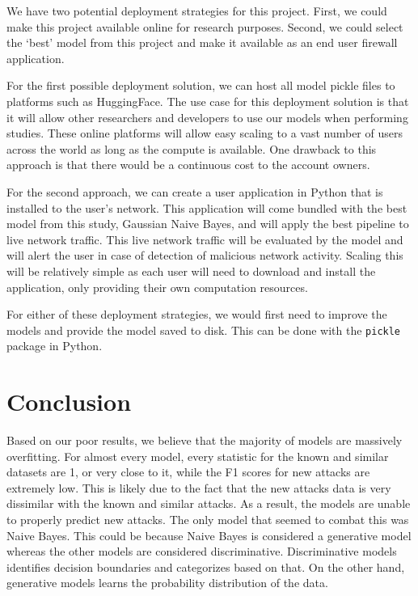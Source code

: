 We have two potential deployment strategies for this project. First, we could make this project available online for research purposes. Second, we could select the `best' model from this project and make it available as an end user firewall application.

For the first possible deployment solution, we can host all model pickle files to platforms such as HuggingFace. The use case for this deployment solution is that it will allow other researchers and developers to use our models when performing studies. These online platforms will allow easy scaling to a vast number of users across the world as long as the compute is available. One drawback to this approach is that there would be a continuous cost to the account owners.

For the second approach, we can create a user application in Python that is installed to the user's network. This application will come bundled with the best model from this study, Gaussian Naive Bayes, and will apply the best pipeline to live network traffic. This live network traffic will be evaluated by the model and will alert the user in case of detection of malicious network activity. Scaling this will be relatively simple as each user will need to download and install the application, only providing their own computation resources.

For either of these deployment strategies, we would first need to improve the models and provide the model saved to disk. This can be done with the \lstinline{pickle} package in Python.



\section{Conclusion}

Based on our poor results, we believe that the majority of models are massively overfitting. For almost every model, every statistic for the known and similar datasets are 1, or very close to it, while the F1 scores for new attacks are extremely low. This is likely due to the fact that the new attacks data is very dissimilar with the known and similar attacks. As a result, the models are unable to properly predict new attacks. The only model that seemed to combat this was Naive Bayes. This could be because Naive Bayes is considered a generative model whereas the other models are considered discriminative. Discriminative models identifies decision boundaries and categorizes based on that. On the other hand, generative models learns the probability distribution of the data.


